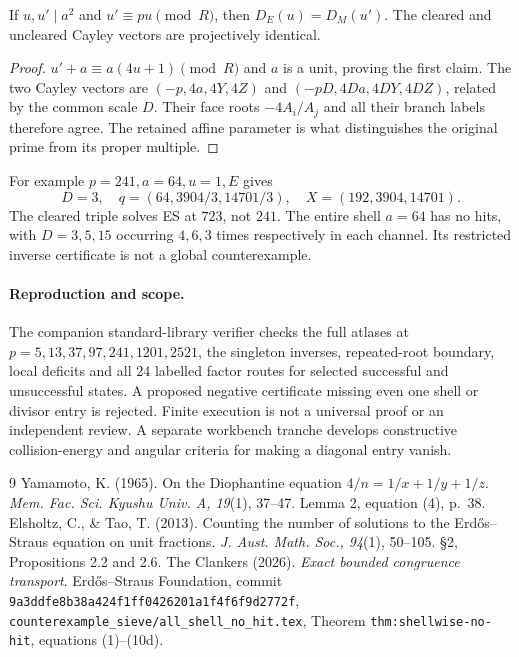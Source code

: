 \documentclass[11pt]{amsart}
\theoremstyle{remark}\newtheorem{remark}[theorem]{Remark}
\begin{document}
\begin{proposition}
If $u,u'\mid a^2$ and $u'\equiv pu\pmod R$, then $D_E(u)=D_M(u')$.
The cleared and uncleared Cayley vectors are projectively identical.
\end{proposition}
\begin{proof}
$u'+a\equiv a(4u+1)\pmod R$ and $a$ is a unit, proving the first claim.
The two Cayley vectors are
$(-p,4a,4Y,4Z)$ and $(-pD,4Da,4DY,4DZ)$, related by the common scale $D$.
Their face roots $-4A_i/A_j$ and all their branch labels therefore agree.
The retained affine parameter is what distinguishes the original prime
from its proper multiple.
\end{proof}

For example $p=241,a=64,u=1,E$ gives
\[
 D=3,\quad q=(64,3904/3,14701/3),\quad X=(192,3904,14701).
\]
The cleared triple solves ES at $723$, not $241$. The entire shell $a=64$
has no hits, with $D=3,5,15$ occurring $4,6,3$ times respectively in each
channel. Its restricted inverse certificate is not a global counterexample.

\paragraph{Reproduction and scope.}
The companion standard-library verifier checks the full atlases at
$p=5,13,37,97,241,1201,2521$, the singleton inverses, repeated-root boundary,
local deficits and all 24 labelled factor routes for selected successful and
unsuccessful states. A proposed negative certificate missing even one shell
or divisor entry is rejected. Finite execution is not a universal proof or
an independent review. A separate workbench tranche develops constructive
collision-energy and angular criteria for making a diagonal entry vanish.

\begin{thebibliography}{9}
 Yamamoto, K. (1965). On the Diophantine equation
$4/n=1/x+1/y+1/z$. \emph{Mem. Fac. Sci. Kyushu Univ. A, 19}(1), 37--47.
Lemma 2, equation (4), p.~38.
 Elsholtz, C., \& Tao, T. (2013). Counting the number of solutions
to the Erd\H{o}s--Straus equation on unit fractions. \emph{J. Aust. Math.
Soc., 94}(1), 50--105. \S2, Propositions 2.2 and 2.6.
 The Clankers (2026). \emph{Exact bounded congruence transport}.
Erd\H{o}s--Straus Foundation, commit
\texttt{9a3ddfe8b38a424f1ff0426201a1f4f6f9d2772f},
\texttt{counterexample\_sieve/all\_shell\_no\_hit.tex},
Theorem \texttt{thm:shellwise-no-hit}, equations (1)--(10d).
\end{thebibliography}
\end{document}
